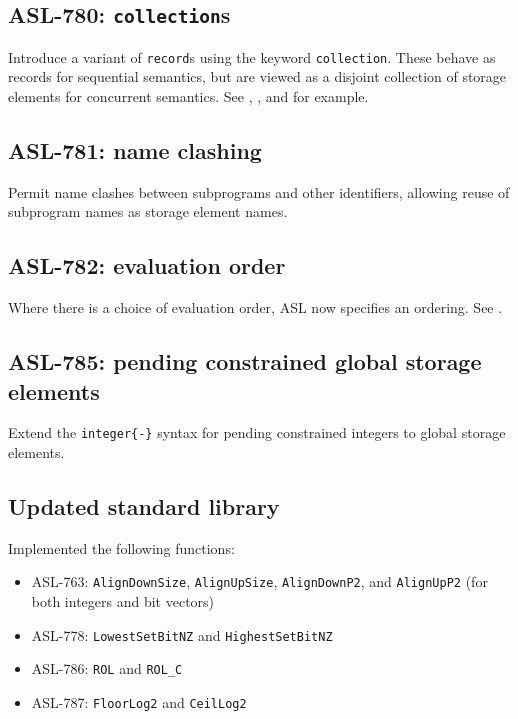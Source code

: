 \subsection{ASL-780: \texttt{collection}s}
Introduce a variant of \texttt{record}s using the keyword \texttt{collection}.
These behave as records for sequential semantics, but are viewed as a disjoint collection of storage elements for concurrent semantics.
See , , and  for example.

\subsection{ASL-781: name clashing}
Permit name clashes between subprograms and other identifiers, allowing reuse of subprogram names as storage element names.

\subsection{ASL-782: evaluation order}
Where there is a choice of evaluation order, ASL now specifies an ordering.
See .

\subsection{ASL-785: pending constrained global storage elements}
Extend the \texttt{integer\{-\}} syntax for pending constrained integers to global storage elements.

\subsection{Updated standard library}
Implemented the following functions:
\begin{itemize}
  \item ASL-763: \texttt{AlignDownSize}, \texttt{AlignUpSize}, \texttt{AlignDownP2}, and \texttt{AlignUpP2} (for both integers and bit vectors)
  \item ASL-778: \texttt{LowestSetBitNZ} and \texttt{HighestSetBitNZ}
  \item ASL-786: \texttt{ROL} and \texttt{ROL\_C}
  \item ASL-787: \texttt{FloorLog2} and \texttt{CeilLog2}
\end{itemize}

